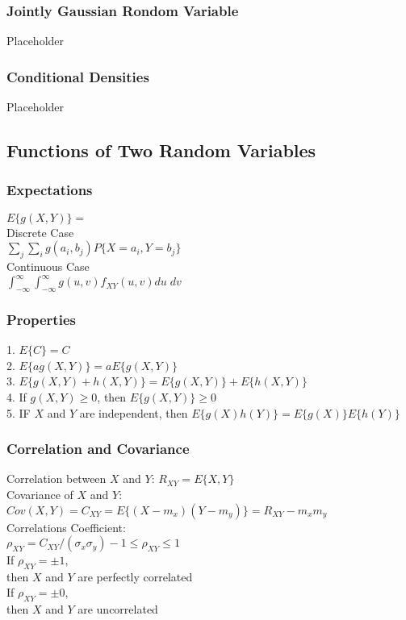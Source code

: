 \subsubsection*{Jointly Gaussian Rondom Variable} 
Placeholder

\subsubsection*{Conditional Densities}
Placeholder

\subsection*{Functions of Two Random Variables}

\subsubsection*{Expectations}
$E\{g(X,Y)\}=$ \\
Discrete Case \\
$\sum_j\sum_ig(a_i,b_j)P\{X=a_i,Y=b_j\}$ \\
Continuous Case \\
$\int_{-\infty}^{\infty}\int_{-\infty}^{\infty}g(u,v)f_{XY}(u,v)du \; dv$

\subsubsection*{Properties}
1. $E\{C\}=C$ \\
2. $E\{ag(X,Y)\}=aE\{g(X,Y)\}$ \\
3. $E\{g(X,Y) + h(X,Y)\}=E\{g(X,Y)\} + E\{h(X,Y)\}$ \\
4. If $g(X,Y) \geq 0$, then $ E\{g(X,Y)\}\geq 0$ \\
5. IF $X$ and $Y$ are independent, then $E\{g(X)h(Y)\}=E\{g(X)\}E\{h(Y)\}$

\subsubsection*{Correlation and Covariance}
Correlation between $X$ and $Y$: $R_{XY}=E\{X,Y\}$ \\
Covariance of $X$ and $Y$: $Cov(X,Y)=C_{XY}=E\{(X-m_x)(Y-m_y)\}=R_{XY}-m_xm_y$ \\
Correlations Coefficient: \\
$\rho_{XY}=C_{XY}/(\sigma_x \sigma_y)-1 \leq \rho_{XY}\leq 1$ \\
If $\rho_{XY}=\pm 1$, \\ then $X$ and $Y$ are perfectly correlated \\
If $\rho_{XY}=\pm 0$, \\ then $X$ and $Y$ are uncorrelated \\


